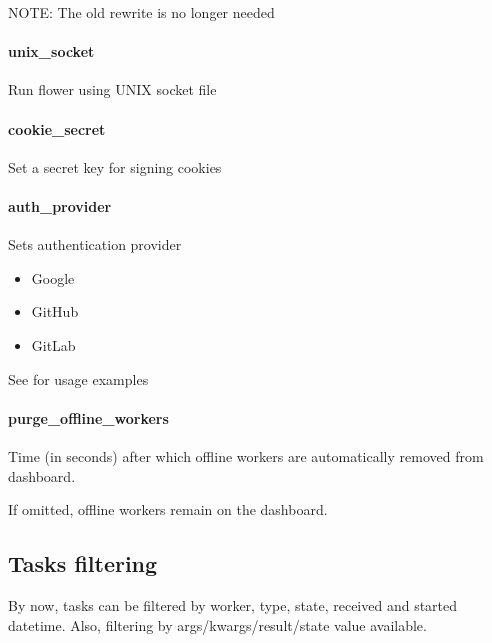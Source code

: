 \documentclass[letterpaper,10pt,english]{sphinxmanual}
\begin{document}
NOTE: The old  rewrite is no longer needed


\paragraph{unix\_socket}
\label{\detokenize{config:unix-socket}}\label{\detokenize{config:id23}}
Run flower using UNIX socket file


\paragraph{cookie\_secret}
\label{\detokenize{config:cookie-secret}}\label{\detokenize{config:id24}}
Set a secret key for signing cookies


\paragraph{auth\_provider}
\label{\detokenize{config:auth-provider}}\label{\detokenize{config:id25}}
Sets authentication provider
\begin{itemize}
\item {} 
Google 

\item {} 
GitHub 

\item {} 
GitLab 

\end{itemize}

See  for usage examples


\paragraph{purge\_offline\_workers}
\label{\detokenize{config:purge-offline-workers}}\label{\detokenize{config:id26}}
Time (in seconds) after which offline workers are automatically removed from dashboard.

If omitted, offline workers remain on the dashboard.


\subsection{Tasks filtering}
\label{\detokenize{tasks_filter:tasks-filtering}}\label{\detokenize{tasks_filter::doc}}
By now, tasks can be filtered by worker, type, state, received and started datetime.
Also, filtering by args/kwargs/result/state value available.
\end{document}
